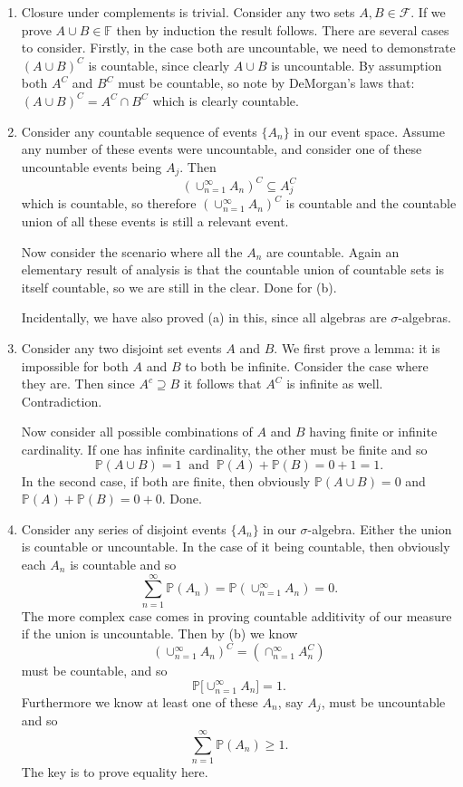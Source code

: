 \documentclass{article}
\begin{document}
\begin{enumerate}[\textbf{(a)}]

\item Closure under complements is trivial. Consider any two sets $A, B \in \mathcal{F}$. If we prove $A \cup B \in \mathbb{F}$ then by induction the result follows. There are several cases to consider. Firstly, in the case both are uncountable, we need to demonstrate $(A \cup B)^C$ is countable, since clearly $A \cup B$ is uncountable. By assumption both $A^C$ and $B^C$ must be countable, so note by DeMorgan's laws that: $(A \cup B)^C = A^C \cap B^C$ which is clearly countable. 

\item Consider any countable sequence of events $\{A_n\}$ in our event space. Assume any number of these events were uncountable, and consider one of these uncountable events being $A_j$. Then \[(\cup_{n = 1}^\infty A_n)^C \subseteq A_j^C \] which is countable, so therefore $(\cup_{n = 1}^\infty A_n)^C$ is countable and the countable union of all these events is still a relevant event. 

Now consider the scenario where all the $A_n$ are countable. Again an elementary result of analysis is that the countable union of countable sets is itself countable, so we are still in the clear. Done for (b). 

Incidentally, we have also proved (a) in this, since all algebras are $\sigma$-algebras.

\item Consider any two disjoint set events $A$ and $B$. We first prove a lemma: it is impossible for both $A$ and $B$ to both be infinite. Consider the case where they are. Then since $A^c \supseteq B$ it follows that $A^C$ is infinite as well. Contradiction. 

Now consider all possible combinations of $A$ and $B$ having finite or infinite cardinality. If one has infinite cardinality, the other must be finite and so \[\mathbb{P}(A \cup B) = 1 \;\; \text{and} \;\; \mathbb{P}(A) + \mathbb{P}(B) = 0 + 1 = 1. \] In the second case, if both are finite, then obviously $\mathbb{P}(A \cup B) = 0$ and $\mathbb{P}(A) + \mathbb{P}(B) = 0 + 0$. Done.  

\item Consider any series of disjoint events $\{A_n\}$ in our $\sigma$-algebra. Either the union is countable or uncountable. In the case of it being countable, then obviously each $A_n$ is countable and so \[\sum_{n = 1}^\infty \mathbb{P}(A_n) = \mathbb{P}(\cup_{n = 1}^\infty A_n) = 0. \] The more complex case comes in proving countable additivity of our measure if the union is uncountable. Then by (b) we know \[(\cup_{n = 1}^\infty A_n)^C = (\cap_{n = 1}^\infty A_n^C) \] must be countable, and so \[\mathbb{P}\Big[\cup_{n = 1}^\infty A_n\Big] = 1.\] Furthermore we know at least one of these $A_n$, say $A_j$, must be uncountable and so \[\sum_{n = 1}^\infty \mathbb{P}(A_n) \geq 1.\] The key is to prove equality here.


\end{enumerate}
\end{document}
